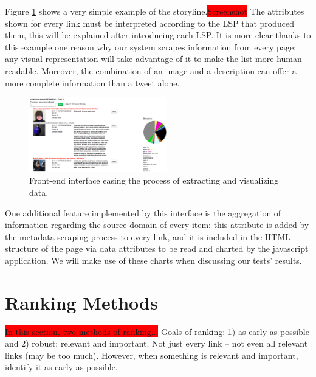 \documentclass{sig-alternate}
\newcommand{\todo}[1]{\colorbox{red}{#1}}
\begin{document}
Figure \ref{fig:javascript_interface} shows a very simple example of the storyline.\todo{Screenshot} The attributes shown for every link must be interpreted according to the LSP that produced them, this will be explained after introducing each LSP. It is more clear thanks to this example one reason why our system scrapes information from every page: any visual representation will take advantage of it to make the list more human readable. Moreover, the combination of an image and a description can offer a more complete information than a tweet alone.
\begin{figure}[htbp]
  \centering
  \includegraphics[width=6cm]{Figures/javascript_interface.png}
  \caption{Front-end interface easing the process of extracting and visualizing data.}
  \label{fig:javascript_interface}
\end{figure}

One additional feature implemented by this interface is the aggregation of information regarding the source domain of every item: this attribute is added by the metadata scraping process to every link, and it is included in the HTML structure of the page via data attributes to be read and charted by the javascript application. We will make use of these charts when discussing our tests' results.

\section{Ranking Methods}
\todo{In this section, two methods of ranking...}
Goals of ranking: 1) as early as possible and 2) robust: relevant and important. Not just every link -- not even all relevant links (may be too much). However, when something is relevant and important, identify it as early as possible,  
\end{document}
